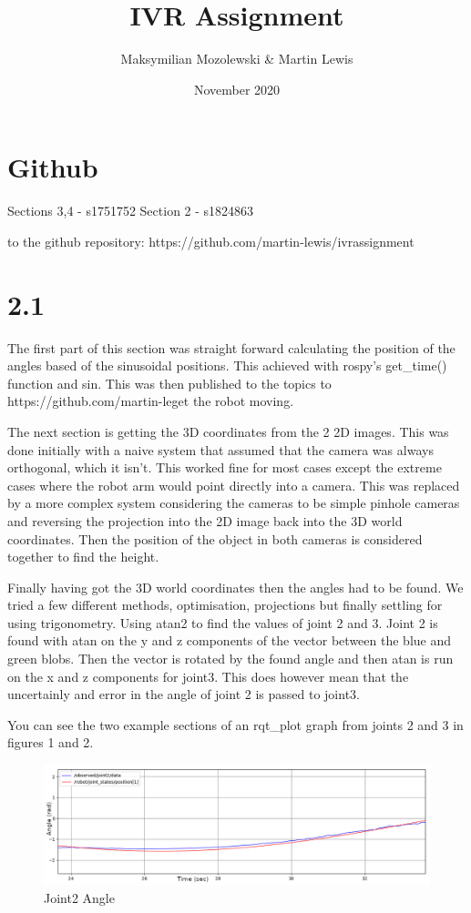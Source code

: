 \documentclass[11pt]{report}
\title{IVR Assignment}
\author{Maksymilian Mozolewski \& Martin Lewis}
\date{November 2020}
\begin{document}

\section*{Github}
Sections 3,4 - s1751752
Section 2 - s1824863

\noindLink to the github repository:  https://github.com/martin-lewis/ivrassignment

\section*{2.1}

The first part of this section was straight forward calculating the position of the angles based of the sinusoidal positions. This achieved with rospy's get\_time() function and sin.
This was then published to the topics to 
\noindent https://github.com/martin-leget the robot moving.

The next section is getting the 3D coordinates from the 2 2D images. This was done initially with a naive system that assumed that the camera was always orthogonal,
which it isn't. This worked fine for most cases except the extreme cases where the robot arm would point directly into a camera. This was replaced by a more complex
system considering the cameras to be simple pinhole cameras and reversing the projection into the 2D image back into the 3D world coordinates. Then the position
of the object in both cameras is considered together to find the height.

Finally having got the 3D world coordinates then the angles had to be found. We tried a few different methods, optimisation, projections but finally settling for using trigonometry. Using atan2 to find the values of
joint 2 and 3. Joint 2 is found with atan on the y and z components of the vector between the blue and green blobs. Then the vector is rotated by the found angle
and then atan is run on the x and z components for joint3. This does however mean that the uncertainly and error in the angle of joint 2 is passed to joint3.

You can see the two example sections of an rqt\_plot graph from joints 2 and 3 in figures 1 and 2.
\begin{figure}[H]
    \includegraphics[width=\linewidth]{joint2.png}
    \caption{Joint2 Angle}
\end{figure}
\end{document}
